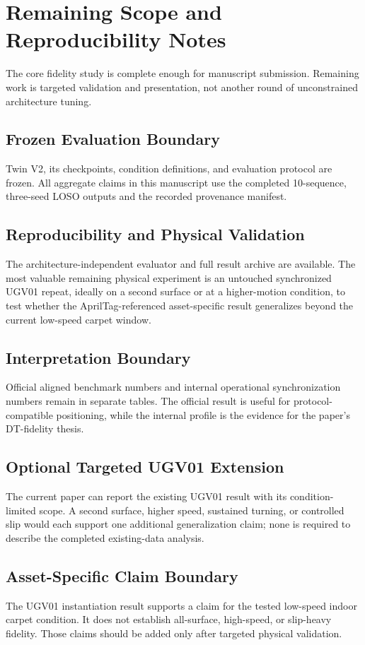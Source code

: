 \documentclass[conference]{IEEEtran}
\begin{document}
\section{Remaining Scope and Reproducibility Notes}
The core fidelity study is complete enough for manuscript submission. Remaining work is targeted validation and presentation, not another round of unconstrained architecture tuning.

\subsection{Frozen Evaluation Boundary}
Twin V2, its checkpoints, condition definitions, and evaluation protocol are frozen. All aggregate claims in this manuscript use the completed 10-sequence, three-seed LOSO outputs and the recorded provenance manifest.

\subsection{Reproducibility and Physical Validation}
The architecture-independent evaluator and full result archive are available. The most valuable remaining physical experiment is an untouched synchronized UGV01 repeat, ideally on a second surface or at a higher-motion condition, to test whether the AprilTag-referenced asset-specific result generalizes beyond the current low-speed carpet window.

\subsection{Interpretation Boundary}
Official aligned benchmark numbers and internal operational synchronization numbers remain in separate tables. The official result is useful for protocol-compatible positioning, while the internal profile is the evidence for the paper's DT-fidelity thesis.

\subsection{Optional Targeted UGV01 Extension}
The current paper can report the existing UGV01 result with its condition-limited scope. A second surface, higher speed, sustained turning, or controlled slip would each support one additional generalization claim; none is required to describe the completed existing-data analysis.

\subsection{Asset-Specific Claim Boundary}
The UGV01 instantiation result supports a claim for the tested low-speed indoor carpet condition. It does not establish all-surface, high-speed, or slip-heavy fidelity. Those claims should be added only after targeted physical validation.
\end{document}
